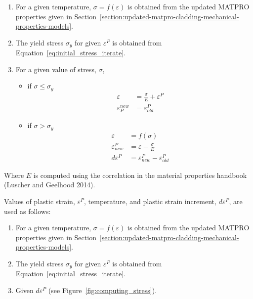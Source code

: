 \begin{enumerate}
\item
  For a given temperature, $\sigma= f(\varepsilon)$ is obtained from the updated
  MATPRO properties given in Section~\ref{section:updated-matpro-cladding-mechanical-properties-models}.
\item
  The yield stress $\sigma_{y}$ for given $\varepsilon^{P}$ is obtained from Equation~\ref{eq:initial_stress_iterate}.
\item
  For a given value of stress, $\sigma$,
    \begin{itemize}
        \item if $\sigma \leq \sigma_{y}$
            \begin{equation} 
                \begin{aligned}
                    \varepsilon           & = \frac{\sigma}{E} + \varepsilon^{P} \\
                    \varepsilon_{P}^{new} & = \varepsilon_{old}^{P}
                \end{aligned}
            \end{equation} 
        \item if $\sigma > \sigma_{y}$
            \begin{equation}
                \begin{aligned}
                    \varepsilon           & = f(\sigma)                      \\
                    \varepsilon_{new}^{P} & = \varepsilon - \frac{\sigma}{E} \\
                    d\varepsilon^{P}      & = \varepsilon_{new}^{P} - \varepsilon_{old}^{P}
                \end{aligned}
            \end{equation}
    \end{itemize}
\end{enumerate}

Where $E$ is computed using the correlation in the material
properties handbook (Luscher and Geelhood 2014).

Values of plastic strain, $\varepsilon^{P}$, temperature, and
plastic strain increment, $d\varepsilon^{P}$, are used as
follows:
\begin{enumerate}
    \item For a given temperature, $\sigma = f(\varepsilon)$ is obtained from the updated MATPRO
        properties given in Section~\ref{section:updated-matpro-cladding-mechanical-properties-models}.
    \item The yield stress $\sigma_{y}$ for given $\varepsilon^{P}$ is obtained from
        Equation~\ref{eq:initial_stress_iterate}.
    \item Given $d\varepsilon^{P}$ (see Figure~\ref{fig:computing_stress}).
\end{enumerate}

